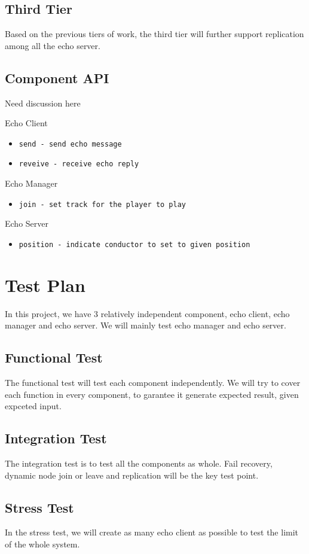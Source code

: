 \documentclass[12pt]{article}
\begin{document}
\subsection{Third Tier}
Based on the previous tiers of work, the third tier will further support 
replication among all the echo server. 

\subsection{Component API}
Need discussion here

Echo Client
\begin{itemize}
  \item \texttt{send - send echo message}  
  \item \texttt{reveive - receive echo reply}  
\end{itemize}
Echo Manager
\begin{itemize}
  \item \texttt{join - set track for the player to play}  
\end{itemize}
Echo Server
\begin{itemize}
  \item \texttt{position - indicate conductor to set to given position}
\end{itemize}

\section{Test Plan}
In this project, we have 3 relatively independent component, echo client, 
echo manager and echo server. We will mainly test echo manager and echo
server.

\subsection{Functional Test}
The functional test will test each component independently. We will try to   
cover each function in every component, to garantee it generate expected  
result, given expceted input.

\subsection{Integration Test}
The integration test is to test all the components as whole. Fail recovery,
dynamic node join or leave and replication will be the key test point.

\subsection{Stress Test}
In the stress test, we will create as many echo client as possible to test
the limit of the whole system.
\end{document}
